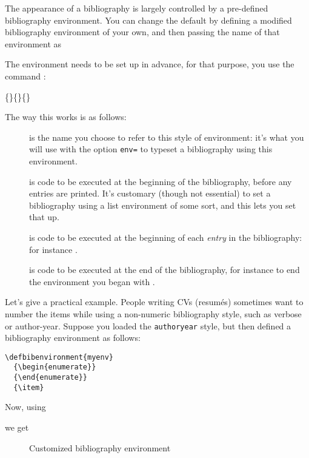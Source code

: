 The appearance of a bibliography is largely controlled by a
pre-defined bibliography environment. You can change the default by
defining a modified bibliography environment of your own, and then
passing the name of that environment as
\begin{center}
\end{center}

The environment needs to be set up in advance, for that purpose, you
use the command :
\begin{center}
\ttfamily
{}\{\}\{\}\{\}
\end{center}

The way this works is as follows:
\begin{description}
\item[] is the name you choose to refer to this style of
  environment: it's what you will use with the option \texttt{env=} to
  typeset a bibliography using this environment.
\item[] is code to be executed at the beginning of the
  bibliography, before any entries are printed. It's customary (though
  not essential) to set a bibliography using a list environment of
  some sort, and this lets you set that up.
\item[] is code to be executed at the beginning of each
  \emph{entry} in the bibliography: for instance .
\item[] is code to be executed at the end of the
  bibliography, for instance to end the environment you began with
  .
\end{description}

Let's give a practical example. People writing CVs (resum\'es)
sometimes want to number the items while using a non-numeric
bibliography style, such as verbose or author-year. Suppose you loaded
the \verb|authoryear| style, but then defined a bibliography
environment as follows:
\begin{verbatim}
\defbibenvironment{myenv}
  {\begin{enumerate}}
  {\end{enumerate}}
  {\item}
\end{verbatim}
Now, using
\begin{pseudoverb}
\relax[env=myenv,heading=myheading]
\end{pseudoverb}
we get

\begin{figure}
\caption{Customized bibliography environment\label{custom-env}}
\end{figure}

